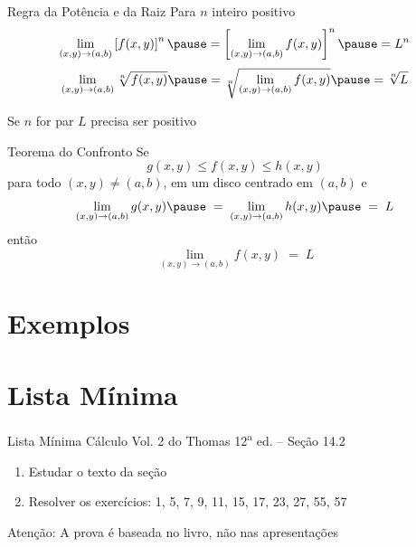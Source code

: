 \documentclass[fleqn,utf8,aspectratio=169,12pt]{beamer}
\begin{document}
\begin{frame}{Regra da Potência e da Raiz}
  Para $n$ inteiro positivo
  \pause
  \[
    \lim_{(x, y)\to(a, b)} \left[f(x, y)\right]^n
    \pause =
    \left[\lim_{(x, y)\to(a, b)} f(x, y)\right]^n
    \pause =
    L^n
  \]
  \pause
  \vspace{\baselineskip}
  \[
    \lim_{(x, y)\to(a, b)} \sqrt[n]{f(x, y)}
    \pause =
    \sqrt[n]{\lim_{(x, y)\to(a, b)} f(x, y)}
    \pause =
    \sqrt[n]{L}
  \]

  \pause
  Se $n$ for par $L$ precisa ser positivo
\end{frame}

\begin{frame}{Teorema do Confronto}
  Se
  \[
    g(x, y) \leq f(x, y) \leq h(x, y)
  \]
  \pause
  para todo \((x, y) \neq (a, b)\),
  \pause
  em um disco centrado em \((a, b)\)
  \pause
  e
  \[
    \lim_{(x, y)\to(a, b)} g(x, y)
    \pause
    \;=\;
    \lim_{(x, y)\to(a, b)} h(x, y)
    \pause
    \;=\;
    L
  \]
  \pause
  então
  \[
    \lim_{(x, y)\to(a, b)} f(x, y) \;=\; L
  \]
\end{frame}

\section{Exemplos}







\section{Lista Mínima}

\begin{frame}{Lista Mínima}
  Cálculo Vol. 2 do Thomas 12\textsuperscript{a} ed. -- Seção 14.2
  \begin{enumerate}
    \item Estudar o texto da seção
    \item Resolver os exercícios: 1, 5, 7, 9, 11, 15, 17, 23, 27, 55, 57
  \end{enumerate}

  \vfill
  Atenção: A prova é baseada no livro, não nas apresentações
\end{frame}

\end{document}
